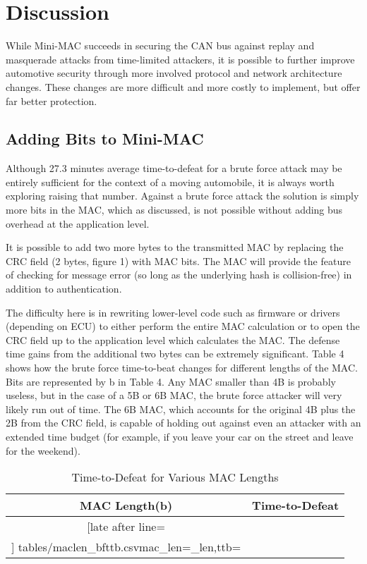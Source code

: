 \section{Discussion}
While Mini-MAC succeeds in securing the CAN bus against replay and masquerade attacks from time-limited attackers, it is possible to further improve automotive security through more involved protocol and network architecture changes. These changes are more difficult and more costly to implement, but offer far better protection. 

\subsection{Adding Bits to Mini-MAC}
Although 27.3 minutes average time-to-defeat for a brute force attack may be entirely sufficient for the context of a moving automobile, it is always worth exploring raising that number. Against a brute force attack the solution is simply more bits in the MAC, which as discussed, is not possible without adding bus overhead at the application level. 

It is possible to add two more bytes to the transmitted MAC by replacing the CRC field (2 bytes, figure 1) with MAC bits. The MAC will provide the feature of checking for message error (so long as the underlying hash is collision-free) in addition to authentication.
	
The difficulty here is in rewriting lower-level code such as firmware or drivers (depending on ECU) to either perform the entire MAC calculation or to open the CRC field up to the application level which calculates the MAC. The defense time gains from the additional two bytes can be extremely significant. Table 4 shows how the brute force time-to-beat changes for different lengths of the MAC. Bits are represented by b in Table 4. Any MAC smaller than 4B is probably useless, but in the case of a 5B or 6B MAC, the brute force attacker will very likely run out of time. The 6B MAC, which accounts for the original 4B plus the 2B from the CRC field, is capable of holding out against even an attacker with an extended time budget (for example, if you leave your car on the street and leave for the weekend).

	\begin{table}	
	\centering
	\begin{tabular}{|c|c|}\hline%
	\bfseries MAC Length(b) & \bfseries Time-to-Defeat\\\hline \csvreader[late after line=\\]%
		{tables/maclen_bfttb.csv}{mac_len=\mac_len,ttb=\ttb}%
		{\mac_len & \ttb}%
		\hline
	\end{tabular}
	\vspace{11pt}
	\caption{Time-to-Defeat for Various MAC Lengths}
	\end{table}

